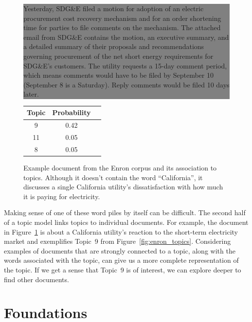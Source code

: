 \begin{figure}

\begin{center}
\colorbox{gray}{ \parbox{.9\linewidth}{
Yesterday, SDG\&E filed a motion for adoption of an
electric procurement cost recovery mechanism and for an order
shortening time for parties to file comments on the mechanism. The
attached email from SDG\&E contains the motion, an executive summary,
and a detailed summary of their proposals and recommendations
governing procurement of the net short energy requirements for
SDG\&E's customers. The utility requests a 15-day comment period, which
means comments would have to be filed by September 10 (September 8
is a Saturday). Reply comments would be filed 10 days later.}}

\begin{tabular}{ccl}
  Topic & Probability \\
  \hline
  9 & 0.42  \\
  11 & 0.05 \\
  8 & 0.05 \\
  \hline
\end{tabular}
\end{center}
  \caption{Example document from the Enron corpus and its association
    to topics.  Although it doesn't contain the word ``California'',
    it discusses a single California utility's dissatisfaction with how
    much it is paying for electricity.}
  \label{fig:enron_doc}
\end{figure}

Making sense of one of these word piles by itself can be difficult.
The second half of a topic model links topics to individual documents.
For example, the document in
Figure~\ref{fig:enron_doc} is about a California utility's reaction to
the short-term electricity market and exemplifies Topic~9 from
Figure~\ref{fig:enron_topics}.
Considering examples of documents that are strongly connected to a topic, along with the words associated with the topic, can give us a more complete representation of the topic.
If we get a sense that Topic~9 is of
interest, we can explore deeper to find other documents.

\section{Foundations}

